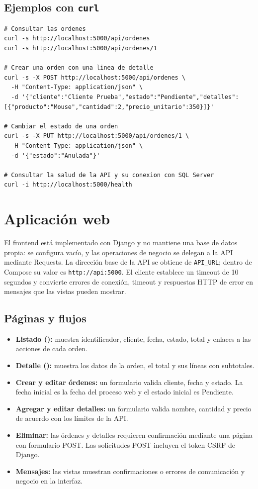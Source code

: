 \documentclass[11pt,a4paper]{article}
\newcommand{\codigo}[1]{\texttt{\detokenize{#1}}}
\begin{document}
\subsection{Ejemplos con \texttt{curl}}
\begin{lstlisting}
# Consultar las ordenes
curl -s http://localhost:5000/api/ordenes
curl -s http://localhost:5000/api/ordenes/1

# Crear una orden con una linea de detalle
curl -s -X POST http://localhost:5000/api/ordenes \
  -H "Content-Type: application/json" \
  -d '{"cliente":"Cliente Prueba","estado":"Pendiente","detalles":[{"producto":"Mouse","cantidad":2,"precio_unitario":350}]}'

# Cambiar el estado de una orden
curl -s -X PUT http://localhost:5000/api/ordenes/1 \
  -H "Content-Type: application/json" \
  -d '{"estado":"Anulada"}'

# Consultar la salud de la API y su conexion con SQL Server
curl -i http://localhost:5000/health
\end{lstlisting}

\section{Aplicación web}

El frontend está implementado con Django y no mantiene una base de datos propia: \codigo{DATABASES} se configura vacío, y las operaciones de negocio se delegan a la API mediante Requests. La dirección base de la API se obtiene de \texttt{API\_URL}; dentro de Compose su valor es \texttt{http://api:5000}. El cliente establece un timeout de 10 segundos y convierte errores de conexión, timeout y respuestas HTTP de error en mensajes que las vistas pueden mostrar.

\subsection{Páginas y flujos}
\begin{itemize}
    \item \textbf{Listado (\codigo{/}):} muestra identificador, cliente, fecha, estado, total y enlaces a las acciones de cada orden.
    \item \textbf{Detalle (\codigo{/ordenes/<id>/}):} muestra los datos de la orden, el total y sus líneas con subtotales.
    \item \textbf{Crear y editar órdenes:} un formulario valida cliente, fecha y estado. La fecha inicial es la fecha del proceso web y el estado inicial es Pendiente.
    \item \textbf{Agregar y editar detalles:} un formulario valida nombre, cantidad y precio de acuerdo con los límites de la API.
    \item \textbf{Eliminar:} las órdenes y detalles requieren confirmación mediante una página con formulario POST. Las solicitudes POST incluyen el token CSRF de Django.
    \item \textbf{Mensajes:} las vistas muestran confirmaciones o errores de comunicación y negocio en la interfaz.
\end{itemize}
\end{document}
